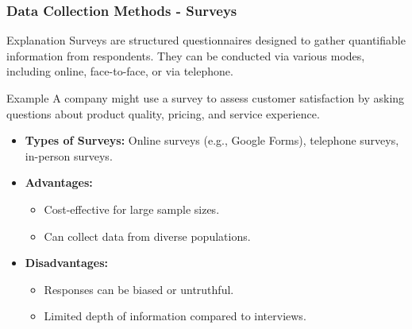 \documentclass[aspectratio=169]{beamer}
\begin{document}
\begin{frame}[fragile]
    \frametitle{Data Collection Methods - Surveys}
    \begin{block}{Explanation}
        Surveys are structured questionnaires designed to gather quantifiable information from respondents. They can be conducted via various modes, including online, face-to-face, or via telephone.
    \end{block}
    \begin{block}{Example}
        A company might use a survey to assess customer satisfaction by asking questions about product quality, pricing, and service experience.
    \end{block}
    \begin{itemize}
        \item \textbf{Types of Surveys:} Online surveys (e.g., Google Forms), telephone surveys, in-person surveys.
        \item \textbf{Advantages:}
        \begin{itemize}
            \item Cost-effective for large sample sizes.
            \item Can collect data from diverse populations.
        \end{itemize}
        \item \textbf{Disadvantages:}
        \begin{itemize}
            \item Responses can be biased or untruthful.
            \item Limited depth of information compared to interviews.
        \end{itemize}
    \end{itemize}
\end{frame}
\end{document}
